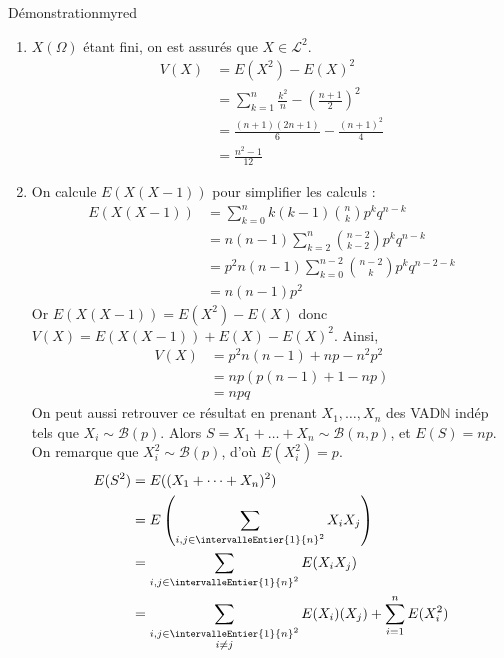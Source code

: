     \begin{demo}{Démonstration}{myred}
        \begin{enumerate}
            \item $X(\Omega)$ étant fini, on est assurés que $X \in \mathcal{L}^2$.
            \begin{align*}
                V(X) 
                &= E(X^2) - E(X)^2 \\
                &= \sum_{k =1}^n \frac{k^2}{n} - \left( \frac{n +1}{2} \right)^2 \\
                &= \frac{(n+1)(2n+1)}{6} - \frac{(n+1)^2}{4} \\
                &= \frac{n^2 - 1}{12}
            \end{align*}
            \item On calcule $E(X(X-1))$ pour simplifier les calculs : 
            \begin{align*}
                E(X(X-1)) 
                &= \sum_{k=0}^{n} k (k-1) \binom{n}{k} p^k q^{n-k} \\
                &= n(n-1) \sum_{k=2}^{n} \binom{n-2}{k-2} p^k q^{n-k} \\
                &= p^2 n (n-1) \sum_{k=0}^{n-2} \binom{n-2}{k} p^{k} q^{n-2 - k} \\
                &= n(n-1) p^2
            \end{align*}
            Or $E(X(X-1)) = E(X^2) - E(X)$ donc $V(X) = E(X(X-1)) + E(X) - E(X)^2$. Ainsi, 
            \begin{align*}
                V(X) 
                &= p^2 n(n-1) + np - n^2 p^2 \\
                &= np (p(n-1) + 1 - np) \\
                &= npq
            \end{align*}
            On peut aussi retrouver ce résultat en prenant $X_1,\ldots,X_n$ des VAD$\mathbb{N}$ indép tels que $X_i \sim \mathcal{B}(p)$. Alors $S = X_1 + \ldots + X_n \sim \mathcal{B}(n,p)$, et $E(S) = np$. On remarque que $X_i^2 \sim \mathcal{B}(p)$, d’où $E(X_i^2) = p$.
            \begin{align*}
                E(S^2) 
                &= E((X_1 + \cdots + X_n)^2) \\
                &= E\left(\sum_{i,j \in \intervalleEntier{1}{n}^2} X_i X_j\right) \\
                &= \sum_{i,j \in \intervalleEntier{1}{n}^2} E(X_i X_j) \\
                &= \sum_{\substack{i,j \in \intervalleEntier{1}{n}^2 \\ i \neq j}} E(X_i)(X_j) + \sum_{i = 1}^n E(X_i^2) \\

\end{align*}
\end{enumerate}
\end{demo}
